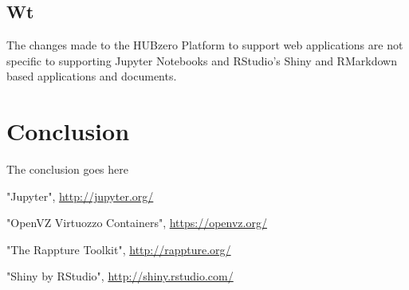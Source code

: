 \documentclass[conference]{../sty/IEEEtran}
\begin{document}


\subsection {Wt}

The changes made to the HUBzero Platform to support web applications are not
specific to supporting Jupyter Notebooks and RStudio's Shiny and RMarkdown
based applications and documents.


\section{Conclusion}
The conclusion goes here




%
%
%
\begin{thebibliography}{1}

	"Jupyter", \url{http://jupyter.org/}
	
"OpenVZ Virtuozzo Containers", \url{https://openvz.org/}
	
	"The Rappture Toolkit", \url{http://rappture.org/}

"Shiny by RStudio", \url{http://shiny.rstudio.com/}
  
\end{thebibliography}
\end{document}
